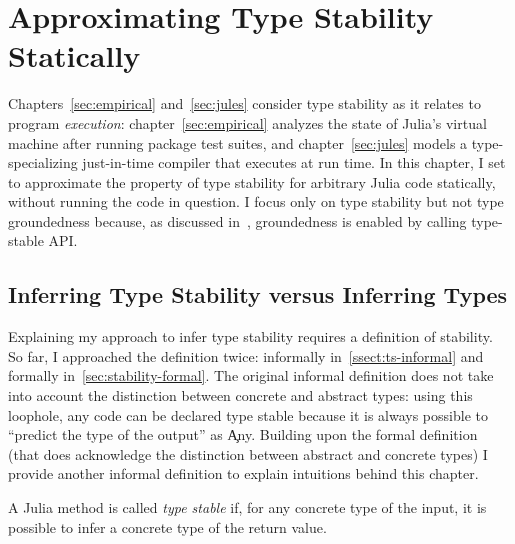 \chapter{Approximating Type Stability Statically}\label{chap:approx}

\lstset{language=julia}


Chapters~\ref{sec:empirical} and~\ref{sec:jules} consider type stability as it
relates to program \emph{execution}: chapter~\ref{sec:empirical} analyzes the
state of Julia's virtual machine after running package test suites, and chapter~\ref{sec:jules} models a
type-specializing just-in-time compiler that executes at run time.
In this chapter, I set to approximate the property of type stability for
arbitrary Julia code statically, without running the code in question.
I focus only on type stability but not type groundedness because,
as discussed in~, groundedness is enabled by calling
type-stable API.

\section{Inferring Type Stability versus Inferring Types}

Explaining my approach to infer type stability requires a definition of stability.
So far, I approached the definition twice: informally
in~\ref{ssect:ts-informal} and formally in~\ref{sec:stability-formal}.
The original informal
definition does not take into account the distinction between concrete and
abstract types: using this loophole, any code can be declared type stable
because it is always possible to ``predict the type of the output'' as \c{Any}.
Building upon the formal definition (that does acknowledge the distinction
between abstract and concrete types)
I provide another informal definition to explain intuitions behind this
chapter.
\begin{definition}
  A Julia method is called \emph{type stable} if, for any concrete type of the
  input, it is possible to infer a concrete type of the return value.
\end{definition}


